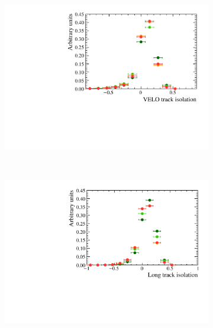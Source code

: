 \begin{figure}
 \begin{subfigure}[b]{0.48\textwidth}
        \includegraphics[width=\textwidth]{./Figs/Appendix1/signal_iso_velo.pdf}
    \end{subfigure}
    ~ %
    \begin{subfigure}[b]{0.48\textwidth}
       \includegraphics[width=\textwidth]{./Figs/Appendix1/signal_long_iso.pdf}
    \end{subfigure}





\end{figure}
